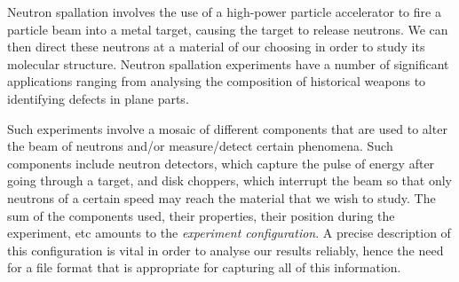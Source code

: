 Neutron spallation involves the use of a high-power particle accelerator to fire a particle beam into a metal target, causing the target to release neutrons. We can then direct these neutrons at a material of our choosing in order to study its molecular structure. Neutron spallation experiments have a number of significant applications ranging from analysing the composition of historical weapons to identifying defects in plane parts.

Such experiments involve a mosaic of different components that are used to alter the beam of neutrons and/or measure/detect certain phenomena. Such components include neutron detectors, which capture the pulse of energy after going through a target, and disk choppers, which interrupt the beam so that only neutrons of a certain speed may reach the material that we wish to study. The sum of the components used, their properties, their position during the experiment, etc amounts to the \textit{experiment configuration}. A precise description of this configuration is vital in order to analyse our results reliably, hence the need for a file format that is appropriate for capturing all of this information.
